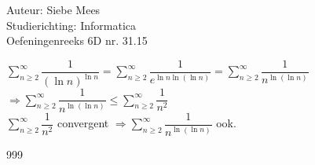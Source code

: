 \documentclass[a4paper]{article}
\begin{document}
  
\noindent \large Auteur: Siebe Mees \\
\noindent \large Studierichting: Informatica\\
\noindent \large Oefeningenreeks 6D nr. 31.15\\

\medskip

\normalsize

$\displaystyle\sum_{n \geq 2}^{\infty}\dfrac{1}{(\ln n)^{\ln n}} = \sum_{n \geq 2}^{\infty}\dfrac{1}{e^{\ln n \ln(\ln n)}} = \sum_{n \geq 2}^{\infty}\dfrac{1}{n^{\ln(\ln n)}}$\\

$\Rightarrow \displaystyle\sum_{n \geq 2}^{\infty}\dfrac{1}{n^{\ln(\ln n)}} \leq \displaystyle\sum_{n \geq 2}^{\infty}\dfrac{1}{n^2}$\\

$\displaystyle\sum_{n \geq 2}^{\infty}\dfrac{1}{n^2}$ convergent $\Rightarrow \displaystyle\sum_{n \geq 2}^{\infty}\dfrac{1}{n^{\ln(\ln n)}}$ ook.\\

\begin{thebibliography}{999}
\end{thebibliography}
\end{document}

